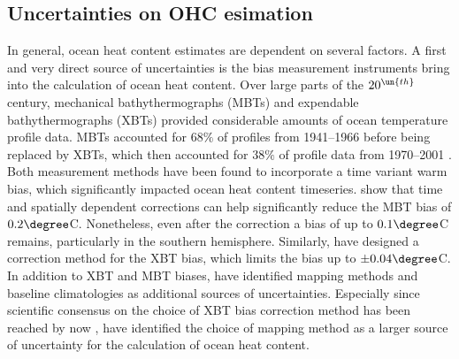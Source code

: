 \documentclass[Masterarbeit.tex]{subfile}
\begin{document}
	\subsection{Uncertainties on OHC esimation}
	
	In general, ocean heat content estimates are dependent on several factors. A first and very direct source of uncertainties is the bias measurement instruments bring into the calculation of ocean heat content. Over large parts of the $20^{\un{th}}$ century, mechanical bathythermographs (MBTs) and expendable bathythermographs (XBTs) provided considerable amounts of ocean temperature profile data. MBTs accounted for $68 \%$ of profiles from 1941--1966 before being replaced by XBTs, which then accounted for $38 \%$ of profile data from 1970--2001 \citep{gouretski_correction_2020}. Both measurement methods have been found to incorporate a time variant warm bias, which significantly impacted ocean heat content timeseries. \cite{gouretski_correction_2020} show that time and spatially dependent corrections can help significantly reduce the MBT bias of $0.2\degree$C. Nonetheless, even after the correction a bias of up to $0.1\degree$C remains, particularly in the southern hemisphere. Similarly, \cite{cheng_time_2014} have designed a correction method for the XBT bias, which limits the bias up to $\pm 0.04\degree$C. In addition to XBT and MBT biases, \cite{boyer_sensitivity_2016} have identified mapping methods and baseline climatologies as additional sources of uncertainties. Especially since scientific consensus on the choice of XBT bias correction method has been reached by now \citep{garcia-soto_overview_2021}, \cite{boyer_sensitivity_2016} have identified the choice of mapping method as a larger source of uncertainty for the calculation of ocean heat content. 
	
\end{document}
